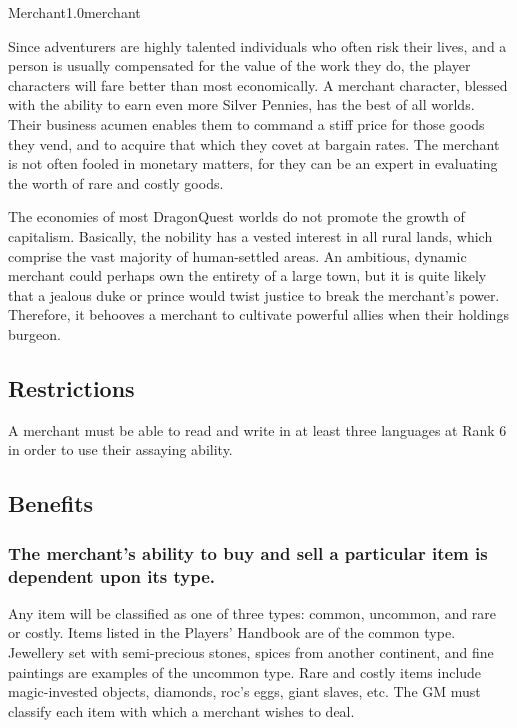 \begin{skill}{Merchant}{1.0}{merchant}

Since adventurers are highly talented individuals who often risk their
lives, and a person is usually compensated for the value of the work
they do, the player characters will fare better than most
economically.  A merchant character, blessed with the ability to earn
even more Silver Pennies, has the best of all worlds.  Their business
acumen enables them to command a stiff price for those goods they
vend, and to acquire that which they covet at bargain rates.  The
merchant is not often fooled in monetary matters, for they can be an
expert in evaluating the worth of rare and costly goods.

The economies of most DragonQuest worlds do not promote the growth of
capitalism.  Basically, the nobility has a vested interest in all
rural lands, which comprise the vast majority of human-settled areas.
An ambitious, dynamic merchant could perhaps own the entirety of a
large town, but it is quite likely that a jealous duke or prince would
twist justice to break the merchant's power.  Therefore, it behooves a
merchant to cultivate powerful allies when their holdings burgeon.

\subsection{Restrictions}

A merchant must be able to read and write in at least three languages
at Rank 6 in order to use their assaying ability.

\subsection{Benefits}

\subsubsection{The merchant's ability to buy and sell a particular item is
dependent upon its type.}

Any item will be classified as one of three types: common, uncommon,
and rare or costly.  Items listed in the Players' Handbook are of the
common type.  Jewellery set with semi-precious stones, spices from
another continent, and fine paintings are examples of the uncommon
type.  Rare and costly items include magic-invested objects, diamonds,
roc's eggs, giant slaves, etc.  The GM must classify each item with
which a merchant wishes to deal.


\end{skill}
